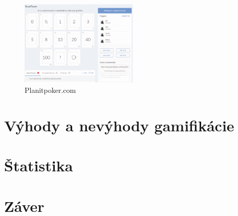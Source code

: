 \documentclass[14pt,twoside,a4paper]{article}
\begin{document}
\begin{figure}[!h]
\centering
\includegraphics[width=0.5\textwidth]{planitpoker.png}
\caption{Planitpoker.com}
\label{fig:planitpoker}
\end{figure}

\section{Výhody a nevýhody gamifikácie}

\section{Štatistika}

\section{Záver}

\quad
\newpage



\end{document}
